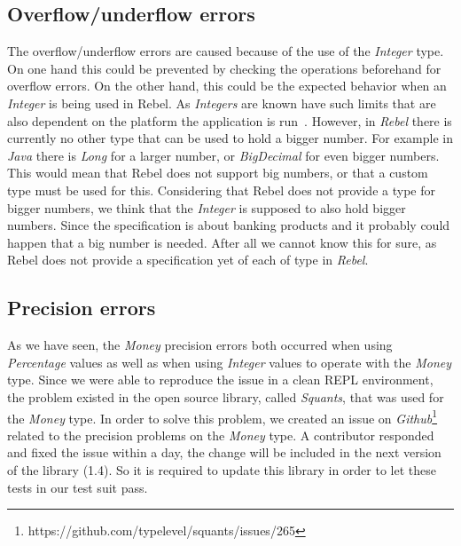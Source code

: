 \subsection*{Overflow/underflow errors}
The overflow/underflow errors are caused because of the use of the
\textit{Integer} type. On one hand this could be prevented by checking the
operations beforehand for overflow errors. On the other hand, this could be the
expected behavior when an \textit{Integer} is being used in Rebel. As
\textit{Integers} are known have such limits that are also dependent on the
platform the application is run~\cite{wang2009intscope}. However, in \textit{Rebel}
there is currently no other type that can be used to hold a bigger number. For
example in \textit{Java} there is \textit{Long} for a larger number, or
\textit{BigDecimal} for even bigger numbers. This would mean that Rebel does not
support big numbers, or that a custom type must be used for this. Considering
that Rebel does not provide a type for bigger numbers, we think that the
\textit{Integer} is supposed to also hold bigger numbers. Since the
specification is about banking products and it probably could happen that a big
number is needed. After all we cannot know this for sure, as Rebel does not
provide a specification yet of each of type in \textit{Rebel}.

\subsection*{Precision errors}
As we have seen, the \textit{Money} precision errors both occurred when using \textit{Percentage} values as well as when using \textit{Integer} values to operate with the \textit{Money} type. Since we were able to reproduce the issue in a clean REPL environment, the problem existed in the open source library, called \textit{Squants}, that was used for the \textit{Money} type. In order to solve this problem, we created an issue on \textit{Github}\footnote{https://github.com/typelevel/squants/issues/265} related to the precision problems on the \textit{Money} type. A contributor responded and fixed the issue within a day, the change will be included in the next version of the library (1.4). So it is required to update this library in order to let these tests in our test suit pass.


